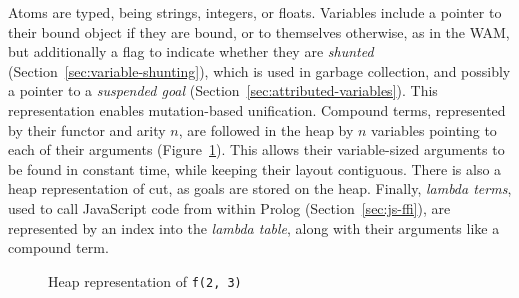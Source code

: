 Atoms are typed, being strings, integers, or floats. Variables include a pointer to their bound object if they are bound, or to themselves otherwise, as in the WAM, but additionally a flag to indicate whether they are \emph{shunted} (Section~\ref{sec:variable-shunting}), which is used in garbage collection, and possibly a pointer to a \emph{suspended goal} (Section~\ref{sec:attributed-variables}). This representation enables mutation-based unification. Compound terms, represented by their functor and arity $n$, are followed in the heap by $n$ variables pointing to each of their arguments (Figure~\ref{fig:compound}). This allows their variable-sized arguments to be found in constant time, while keeping their layout contiguous. There is also a heap representation of cut, as goals are stored on the heap. Finally, \emph{lambda terms}, used to call JavaScript code from within Prolog (Section~\ref{sec:js-ffi}), are represented by an index into the \emph{lambda table}, along with their arguments like a compound term.

\begin{figure}[H]
\centering
{}
\caption{Heap representation of \texttt{f(2, 3)}}
\label{fig:compound}
\end{figure}

